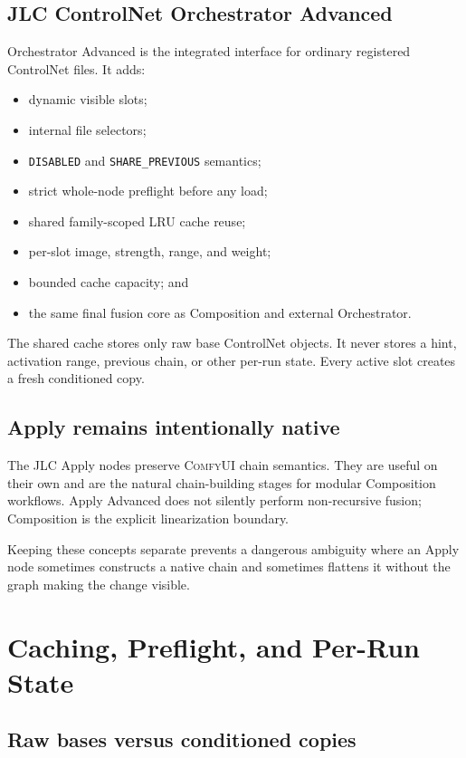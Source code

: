 \documentclass[11pt]{article}
\newcommand{\ComfyUI}{\textsc{ComfyUI}}
\newcommand{\JLC}{\textsc{JLC}}
\newcommand{\code}[1]{\texttt{#1}}
\begin{document}
\subsection{JLC ControlNet Orchestrator Advanced}

Orchestrator Advanced is the integrated interface for ordinary registered ControlNet files. It adds:

\begin{itemize}
  \item dynamic visible slots;
  \item internal file selectors;
  \item \code{DISABLED} and \code{SHARE\_PREVIOUS} semantics;
  \item strict whole-node preflight before any load;
  \item shared family-scoped LRU cache reuse;
  \item per-slot image, strength, range, and weight;
  \item bounded cache capacity; and
  \item the same final fusion core as Composition and external Orchestrator.
\end{itemize}

The shared cache stores only raw base ControlNet objects. It never stores a hint, activation range, previous chain, or other per-run state. Every active slot creates a fresh conditioned copy.

\subsection{Apply remains intentionally native}

The \JLC{} Apply nodes preserve \ComfyUI{} chain semantics. They are useful on their own and are the natural chain-building stages for modular Composition workflows. Apply Advanced does not silently perform non-recursive fusion; Composition is the explicit linearization boundary.

Keeping these concepts separate prevents a dangerous ambiguity where an Apply node sometimes constructs a native chain and sometimes flattens it without the graph making the change visible.

\section{Caching, Preflight, and Per-Run State}

\subsection{Raw bases versus conditioned copies}
\end{document}
